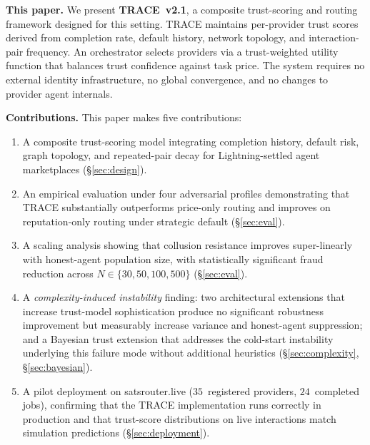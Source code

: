 \documentclass[sigconf,nonacm,10pt]{acmart}
\begin{document}
\noindent\textbf{This paper.}
We present \textbf{TRACE~v2.1}, a composite trust-scoring and
routing framework designed for this setting. TRACE maintains
per-provider trust scores derived from completion rate, default
history, network topology, and interaction-pair frequency. An
orchestrator selects providers via a trust-weighted utility
function that balances trust confidence against task price. The
system requires no external identity infrastructure, no global
convergence, and no changes to provider agent internals.

\noindent\textbf{Contributions.} This paper makes five
contributions:

\begin{enumerate}[leftmargin=*,topsep=2pt,itemsep=2pt]
  \item A composite trust-scoring model integrating completion
        history, default risk, graph topology, and repeated-pair
        decay for Lightning-settled agent marketplaces
        (\S\ref{sec:design}).
  \item An empirical evaluation under four adversarial profiles
        demonstrating that TRACE substantially outperforms
        price-only routing and improves on reputation-only routing
        under strategic default (\S\ref{sec:eval}).
  \item A scaling analysis showing that collusion resistance
        improves super-linearly with honest-agent population
        size, with statistically significant fraud reduction
        across $N \in \{30, 50, 100, 500\}$
        (\S\ref{sec:eval}).
  \item A \emph{complexity-induced instability} finding: two
        architectural extensions that increase trust-model
        sophistication produce no significant robustness
        improvement but measurably increase variance and
        honest-agent suppression; and a Bayesian trust
        extension that addresses the cold-start instability
        underlying this failure mode without additional heuristics
        (\S\ref{sec:complexity}, \S\ref{sec:bayesian}).
  \item A pilot deployment on satsrouter.live ($35$~registered
        providers, $24$~completed jobs), confirming that the TRACE
        implementation runs correctly in production and that
        trust-score distributions on live interactions match
        simulation predictions (\S\ref{sec:deployment}).
\end{enumerate}
\end{document}

